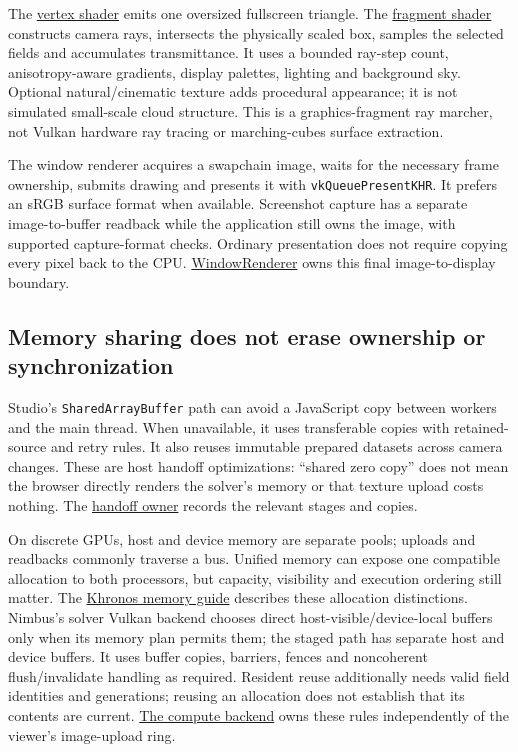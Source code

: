 \documentclass[
  11pt,
]{article}
\begin{document}
The \href{../vulkan/shaders/rendering/volume.vert}{vertex shader} emits
one oversized fullscreen triangle. The
\href{../vulkan/shaders/rendering/volume.frag}{fragment shader}
constructs camera rays, intersects the physically scaled box, samples
the selected fields and accumulates transmittance. It uses a bounded
ray-step count, anisotropy-aware gradients, display palettes, lighting
and background sky. Optional natural/cinematic texture adds procedural
appearance; it is not simulated small-scale cloud structure. This is a
graphics-fragment ray marcher, not Vulkan hardware ray tracing or
marching-cubes surface extraction.

The window renderer acquires a swapchain image, waits for the necessary
frame ownership, submits drawing and presents it with
\texttt{vkQueuePresentKHR}. It prefers an sRGB surface format when
available. Screenshot capture has a separate image-to-buffer readback
while the application still owns the image, with supported
capture-format checks. Ordinary presentation does not require copying
every pixel back to the CPU.
\href{../vulkan/src/rendering/window_renderer.cpp}{WindowRenderer} owns
this final image-to-display boundary.

\subsection{Memory sharing does not erase ownership or
synchronization}\label{memory-sharing-does-not-erase-ownership-or-synchronization}

Studio's \texttt{SharedArrayBuffer} path can avoid a JavaScript copy
between workers and the main thread. When unavailable, it uses
transferable copies with retained-source and retry rules. It also reuses
immutable prepared datasets across camera changes. These are host
handoff optimizations: ``shared zero copy'' does not mean the browser
directly renders the solver's memory or that texture upload costs
nothing. The \href{../ui/src/lib/vtk/vtkDatasetHandoff.ts}{handoff
owner} records the relevant stages and copies.

On discrete GPUs, host and device memory are separate pools; uploads and
readbacks commonly traverse a bus. Unified memory can expose one
compatible allocation to both processors, but capacity, visibility and
execution ordering still matter. The
\href{https://docs.vulkan.org/guide/latest/memory_allocation.html}{Khronos
memory guide} describes these allocation distinctions. Nimbus's solver
Vulkan backend chooses direct host-visible/device-local buffers only
when its memory plan permits them; the staged path has separate host and
device buffers. It uses buffer copies, barriers, fences and noncoherent
flush/invalidate handling as required. Resident reuse additionally needs
valid field identities and generations; reusing an allocation does not
establish that its contents are current.
\href{../vulkan/src/compute/compute_backend_vulkan.cpp}{The compute
backend} owns these rules independently of the viewer's image-upload
ring.
\end{document}
